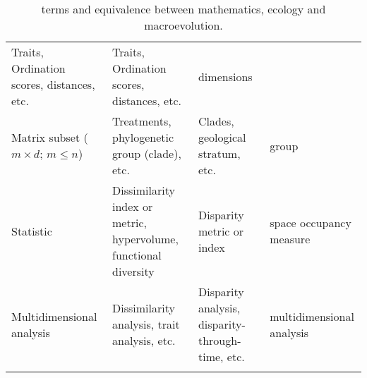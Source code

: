 \documentclass[]{article}
\begin{document}
\begin{longtable}[]{llll}
\begin{minipage}[t]{0.2111\columnwidth}
Traits, Ordination scores, distances, etc.\strut
\end{minipage} & \begin{minipage}[t]{0.2111\columnwidth}\raggedright\strut
Traits, Ordination scores, distances, etc.\strut
\end{minipage} & \begin{minipage}[t]{0.2111\columnwidth}\raggedright\strut
dimensions\strut
\end{minipage}\tabularnewline
\begin{minipage}[t]{0.2111\columnwidth}\raggedright\strut
Matrix subset (\(m \times d\); \(m \leq n\))\strut
\end{minipage} & \begin{minipage}[t]{0.2111\columnwidth}\raggedright\strut
Treatments, phylogenetic group (clade), etc.\strut
\end{minipage} & \begin{minipage}[t]{0.2111\columnwidth}\raggedright\strut
Clades, geological stratum, etc.\strut
\end{minipage} & \begin{minipage}[t]{0.2111\columnwidth}\raggedright\strut
group\strut
\end{minipage}\tabularnewline
\begin{minipage}[t]{0.2111\columnwidth}\raggedright\strut
Statistic\strut
\end{minipage} & \begin{minipage}[t]{0.2111\columnwidth}\raggedright\strut
Dissimilarity index or metric, hypervolume, functional diversity\strut
\end{minipage} & \begin{minipage}[t]{0.2111\columnwidth}\raggedright\strut
Disparity metric or index\strut
\end{minipage} & \begin{minipage}[t]{0.2111\columnwidth}\raggedright\strut
space occupancy measure\strut
\end{minipage}\tabularnewline
\begin{minipage}[t]{0.2111\columnwidth}\raggedright\strut
Multidimensional analysis\strut
\end{minipage} & \begin{minipage}[t]{0.2111\columnwidth}\raggedright\strut
Dissimilarity analysis, trait analysis, etc.\strut
\end{minipage} & \begin{minipage}[t]{0.2111\columnwidth}\raggedright\strut
Disparity analysis, disparity-through-time, etc.\strut
\end{minipage} & \begin{minipage}[t]{0.2111\columnwidth}\raggedright\strut
multidimensional analysis\strut
\end{minipage}\tabularnewline
\bottomrule
\caption{terms and equivalence between mathematics, ecology and
macroevolution.}
\end{longtable}
\end{document}

